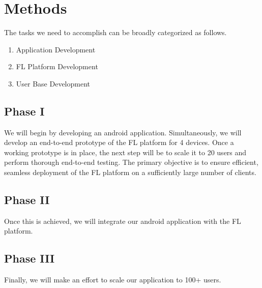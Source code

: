 \section{Methods}
    The tasks we need to accomplish can be broadly categorized as follows. \newline

    \begin{enumerate}
        \item Application Development
        \item FL Platform Development
        \item User Base Development
    \end{enumerate}

    \subsection{Phase I}
    We will begin by developing an android application.
    Simultaneously, we will develop an end-to-end prototype of the FL platform for 4 devices.
    Once a working prototype is in place, the next step will be to scale it to 20 users and perform thorough end-to-end testing.
    The primary objective is to ensure efficient, seamless deployment of the FL platform on a sufficiently large number of clients.
    \subsection{Phase II}
    Once this is achieved, we will integrate our android application with the FL platform.
    \subsection{Phase III}
    Finally, we will make an effort to scale our application to 100+ users.

    \begin{table}[t]
        
    \end{table}

